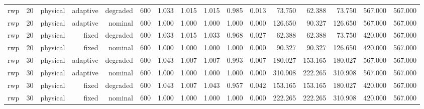 \begin{tabular}{lrrrrrrrrrrrrrrr}
rwp & 20 & physical & adaptive & degraded & 600 & 1.033 & 1.015 & 1.015 & 0.985 & 0.013 & 73.750 & 62.388 & 73.750 & 567.000 & 567.000 \\
rwp & 20 & physical & adaptive & nominal & 600 & 1.000 & 1.000 & 1.000 & 1.000 & 0.000 & 126.650 & 90.327 & 126.650 & 567.000 & 567.000 \\
rwp & 20 & physical & fixed & degraded & 600 & 1.033 & 1.015 & 1.033 & 0.968 & 0.027 & 62.388 & 62.388 & 73.750 & 420.000 & 567.000 \\
rwp & 20 & physical & fixed & nominal & 600 & 1.000 & 1.000 & 1.000 & 1.000 & 0.000 & 90.327 & 90.327 & 126.650 & 420.000 & 567.000 \\
rwp & 30 & physical & adaptive & degraded & 600 & 1.043 & 1.007 & 1.007 & 0.993 & 0.007 & 180.027 & 153.165 & 180.027 & 567.000 & 567.000 \\
rwp & 30 & physical & adaptive & nominal & 600 & 1.000 & 1.000 & 1.000 & 1.000 & 0.000 & 310.908 & 222.265 & 310.908 & 567.000 & 567.000 \\
rwp & 30 & physical & fixed & degraded & 600 & 1.043 & 1.007 & 1.043 & 0.957 & 0.042 & 153.165 & 153.165 & 180.027 & 420.000 & 567.000 \\
rwp & 30 & physical & fixed & nominal & 600 & 1.000 & 1.000 & 1.000 & 1.000 & 0.000 & 222.265 & 222.265 & 310.908 & 420.000 & 567.000 \\
\bottomrule
\end{tabular}